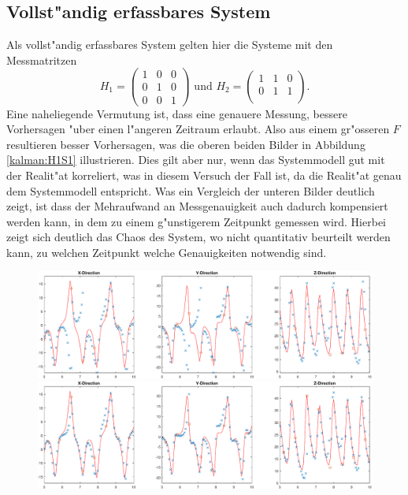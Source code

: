 \begin{refsection}
\subsection{Vollst"andig erfassbares System}
Als vollst"andig erfassbares System gelten hier die Systeme mit den Messmatritzen
\[
H_{1}=\begin{pmatrix}
1 & 0 & 0 \\ 
0 & 1 & 0 \\ 
0 & 0 & 1
\end{pmatrix} 
\text{ und }
H_{2}=\begin{pmatrix}
1 & 1 & 0 \\ 
0 & 1 & 1 \\ 
\end{pmatrix}
\text{.}
\]
Eine naheliegende Vermutung ist, dass eine genauere Messung, bessere Vorhersagen "uber einen l"angeren Zeitraum erlaubt. Also aus einem gr"osseren $F$ resultieren besser Vorhersagen, was die oberen beiden Bilder in Abbildung \ref{kalman:H1S1} illustrieren. Dies gilt aber nur, wenn das Systemmodell gut mit der Realit"at korreliert, was in diesem Versuch der Fall ist, da die Realit"at genau dem Systemmodell entspricht.
Was ein Vergleich der unteren Bilder deutlich zeigt, ist dass der Mehraufwand an Messgenauigkeit auch dadurch kompensiert werden kann, in dem zu einem g"unstigerem Zeitpunkt gemessen wird. Hierbei zeigt sich deutlich das Chaos des System, wo nicht quantitativ beurteilt werden kann, zu welchen Zeitpunkt welche Genauigkeiten notwendig sind.
\begin{figure}
\centering
\includegraphics[width=\hsize]{kalman/figures/H1R10S1.pdf}
\includegraphics[width=\hsize]{kalman/figures/H1R20S1.pdf}

\end{figure}
\end{refsection}
